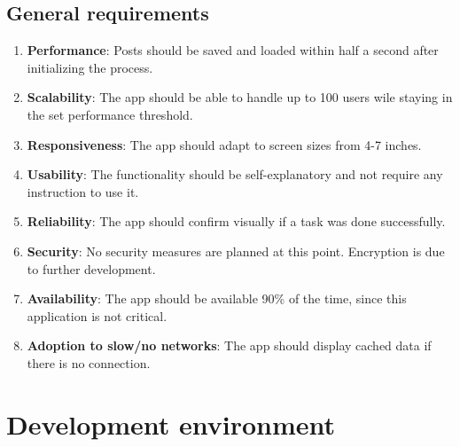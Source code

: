 \documentclass[conference]{IEEEtran}
\numberwithin{figure}{subsection}
\begin{document}
\subsection{General requirements}
\begin{enumerate}

 \item \textbf{Performance}: Posts should be saved and loaded within half a second after initializing the process.\\

 \item \textbf{Scalability}: The app should be able to handle up to 100 users wile staying in the set performance threshold.\\

 \item \textbf{Responsiveness}: The app should adapt to screen sizes from 4-7 inches.\\

 \item \textbf{Usability}: The functionality should be self-explanatory and not require any instruction to use it.\\

 \item \textbf{Reliability}: The app should confirm visually if a task was done successfully.\\

 \item \textbf{Security}: No security measures are planned at this point. Encryption is due to further development.\\

 \item \textbf{Availability}: The app should be available 90\% of the time, since this application is not critical.\\

 \item \textbf{Adoption to slow/no networks}: The app should display cached data if there is no connection.\\

\end{enumerate}


\section{Development environment}
\end{document}
